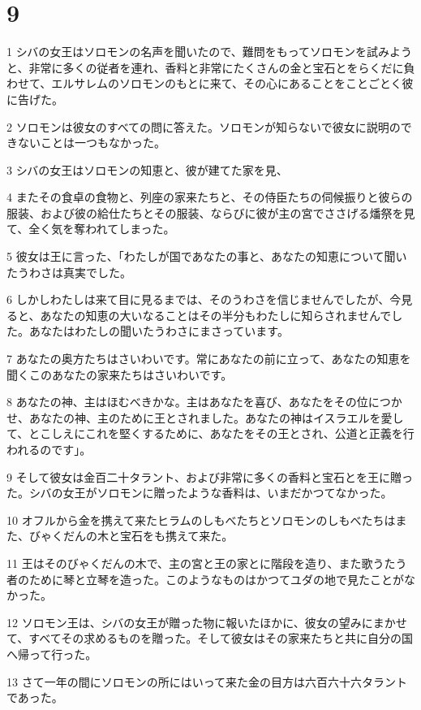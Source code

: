 \chapter{9}

\par 1 シバの女王はソロモンの名声を聞いたので、難問をもってソロモンを試みようと、非常に多くの従者を連れ、香料と非常にたくさんの金と宝石とをらくだに負わせて、エルサレムのソロモンのもとに来て、その心にあることをことごとく彼に告げた。
\par 2 ソロモンは彼女のすべての問に答えた。ソロモンが知らないで彼女に説明のできないことは一つもなかった。
\par 3 シバの女王はソロモンの知恵と、彼が建てた家を見、
\par 4 またその食卓の食物と、列座の家来たちと、その侍臣たちの伺候振りと彼らの服装、および彼の給仕たちとその服装、ならびに彼が主の宮でささげる燔祭を見て、全く気を奪われてしまった。
\par 5 彼女は王に言った、「わたしが国であなたの事と、あなたの知恵について聞いたうわさは真実でした。
\par 6 しかしわたしは来て目に見るまでは、そのうわさを信じませんでしたが、今見ると、あなたの知恵の大いなることはその半分もわたしに知らされませんでした。あなたはわたしの聞いたうわさにまさっています。
\par 7 あなたの奥方たちはさいわいです。常にあなたの前に立って、あなたの知恵を聞くこのあなたの家来たちはさいわいです。
\par 8 あなたの神、主はほむべきかな。主はあなたを喜び、あなたをその位につかせ、あなたの神、主のために王とされました。あなたの神はイスラエルを愛して、とこしえにこれを堅くするために、あなたをその王とされ、公道と正義を行われるのです」。
\par 9 そして彼女は金百二十タラント、および非常に多くの香料と宝石とを王に贈った。シバの女王がソロモンに贈ったような香料は、いまだかつてなかった。
\par 10 オフルから金を携えて来たヒラムのしもべたちとソロモンのしもべたちはまた、びゃくだんの木と宝石をも携えて来た。
\par 11 王はそのびゃくだんの木で、主の宮と王の家とに階段を造り、また歌うたう者のために琴と立琴を造った。このようなものはかつてユダの地で見たことがなかった。
\par 12 ソロモン王は、シバの女王が贈った物に報いたほかに、彼女の望みにまかせて、すべてその求めるものを贈った。そして彼女はその家来たちと共に自分の国へ帰って行った。
\par 13 さて一年の間にソロモンの所にはいって来た金の目方は六百六十六タラントであった。
